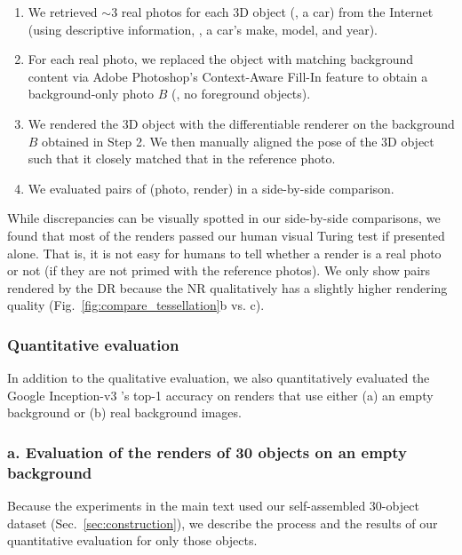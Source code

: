\documentclass[10pt,twocolumn,letterpaper]{article}
\begin{document}
\begin{enumerate}
	\item We retrieved $\sim$3 real photos for each 3D object (\eg, a car) from the Internet (using descriptive information, \eg, a car's make, model, and year).
	\item For each real photo, we replaced the object with matching background content via Adobe Photoshop's Context-Aware Fill-In feature to obtain a background-only photo $B$ (\ie, no foreground objects).
	\item We rendered the 3D object with the differentiable renderer on the background $B$ obtained in Step 2.
	We then manually aligned the pose of the 3D object such that it closely matched that in the reference photo.
	\item We evaluated pairs of (photo, render) in a side-by-side comparison.
\end{enumerate}

While discrepancies can be visually spotted in our side-by-side comparisons, we found that most of the renders passed our human visual Turing test if presented alone.
That is, it is not easy for humans to tell whether a render is a real photo or not (if they are not primed with the reference photos).
We only show pairs rendered by the DR because the NR qualitatively has a slightly higher rendering quality (Fig.~\ref{fig:compare_tessellation}b vs. c).

\subsubsection{Quantitative evaluation} 
\label{sec:quantitative_eval}



In addition to the qualitative evaluation, we also quantitatively evaluated the Google Inception-v3 \cite{szegedy2016rethinking}'s top-1 accuracy on renders that use either (a) an empty background or (b) real background images.

\subsubsection*{a. Evaluation of the renders of 30 objects on an empty background} 

Because the experiments in the main text used our self-assembled 30-object dataset (Sec.~\ref{sec:construction}), we describe the process and the results of our quantitative evaluation for only those objects.
\end{document}
